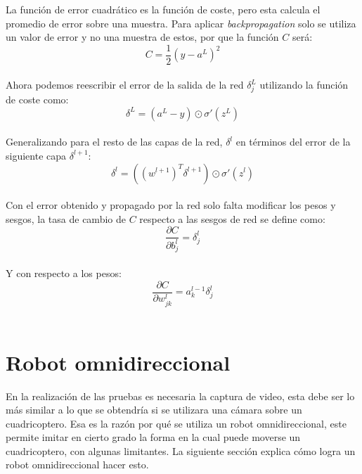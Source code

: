 \documentclass{iccmemoria}
\begin{document}
La función de error cuadrático es la función de coste, pero esta calcula el promedio de error sobre una muestra. Para aplicar \emph{backpropagation} solo se utiliza un valor de error y no una muestra de estos, por que la función $C$ será:\\

\begin{equation}
	C = \frac{1}{2} (y-a^L )^2
\end{equation}\\

Ahora podemos reescribir el error de la salida de la red $\delta^L_j$ utilizando la función de coste como:\\

\begin{equation}
	\delta^L = (a^L-y) \odot \sigma'(z^L)
\end{equation}\\

Generalizando para el resto de las capas de la red, $\delta^l$ en términos del error de la siguiente capa $\delta^{l+1}$:\\

\begin{equation}
	\delta^l = ((w^{l+1})^T \delta^{l+1}) \odot \sigma'(z^l)
\end{equation}\\

Con el error obtenido y propagado por la red solo falta modificar los pesos y sesgos, la tasa de cambio de $C$ respecto a las sesgos de red se define como:\\

\begin{equation}
	\frac{\partial C}{\partial b^l_j} =
  \delta^l_j
\end{equation}\\

Y con respecto a los pesos:\\

\begin{equation}
	\frac{\partial C}{\partial w^l_{jk}} = a^{l-1}_k \delta^l_j
\end{equation}\\

\section{Robot omnidireccional}\label{omni_robot}

En la realización de las pruebas es necesaria la captura de video, esta debe ser lo más similar a lo que se obtendría si se utilizara una cámara sobre un cuadricoptero. Esa es la razón por qué se utiliza un robot omnidireccional, este permite imitar en cierto grado la forma en la cual puede moverse un cuadricoptero, con algunas limitantes. La siguiente sección explica cómo logra un robot omnidireccional hacer esto.\\
\end{document}
